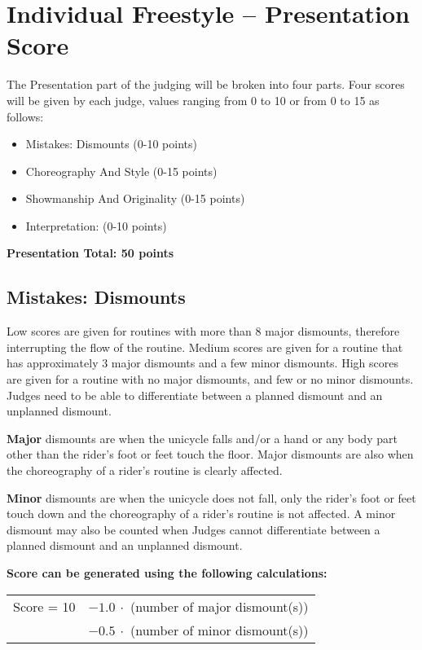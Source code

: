 \section{Individual Freestyle -- Presentation Score \label{sec:freestyle_individual-presentation-score}}
The Presentation part of the judging will be broken into four parts.
Four scores will be given by each judge, values ranging from 0 to 10 or from 0 to 15 as follows:
\begin{itemize}
\item Mistakes: Dismounts (0-10 points) 
\item Choreography And Style (0-15 points) 
\item Showmanship And Originality (0-15 points) 
\item Interpretation: (0-10 points)
\end{itemize}
\textbf{Presentation Total: 50 points}

\subsection{Mistakes: Dismounts}
Low scores are given for routines with more than 8 major dismounts, therefore interrupting the flow of the routine.
Medium scores are given for a routine that has approximately 3 major dismounts and a few minor dismounts.
High scores are given for a routine with no major dismounts, and few or no minor dismounts.
Judges need to be able to differentiate between a planned dismount and an unplanned dismount.

\textbf{Major} dismounts are when the unicycle falls and/or a hand or any body part other than the rider's foot or feet touch the floor.
Major dismounts are also when the choreography of a rider's routine is clearly affected.

\textbf{Minor} dismounts are when the unicycle does not fall, only the rider's foot or feet touch down and the choreography of a rider's routine is not affected.
A minor dismount may also be counted when Judges cannot differentiate between a planned dismount and an unplanned dismount.


\textbf{Score can be generated using the following calculations:}

\begin{tabular}{r l}
Score = 10 & $- 1.0\ \cdot$ (number of major dismount(s)) \\
 & $- 0.5\ \cdot$ (number of minor dismount(s)) \\
\end{tabular}


